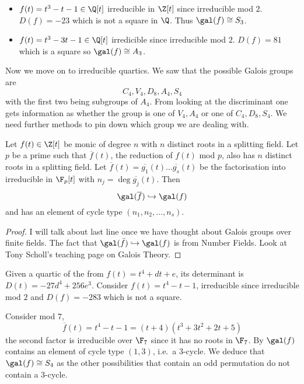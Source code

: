 \documentclass[a4paper]{article}
\newcommand*{\red}[1]{\overline{#1}}
\begin{document}
\begin{eg}\leavevmode
  \begin{itemize}
  \item \(f(t) = t^3 - t - 1 \in \Q[t]\) irreducible in \(\Z[t]\) since irreducible mod \(2\). \(D(f) = -23\) which is not a square in \(\Q\). Thus \(\gal(f) \cong S_3\).
  \item \(f(t) = t^3 - 3t - 1 \in \Q[t]\) irredicible since irreducible mod \(2\). \(D(f) = 81\) which is a square so \(\gal(f) \cong A_3\).
  \end{itemize}
\end{eg}

Now we move on to irreducible quartics. We saw that the possible Galois groups are
\[
  C_4, V_4, D_8, A_4, S_4
\]
with the first two being subgroups of \(A_4\). From looking at the discriminant one gets information as whether the group is one of \(V_4, A_4\) or one of \(C_4, D_8, S_4\). We need further methods to pin down which group we are dealing with.

\begin{theorem}
  \label{thm:mod p reduction}
  Let \(f(t) \in \Z[t]\) be monic of degree \(n\) with \(n\) distinct roots in a splitting field. Let \(p\) be a prime such that \(\red f(t)\), the reduction of \(f(t)\) mod \(p\), also has \(n\) distinct roots in a splitting field. Let \(\red f(t) = \red{g_1}(t) \dots \red{g_s}(t)\) be the factorisation into irreducible in \(\F_p[t]\) with \(n_j =  \deg \red{g_j}(t)\). Then
  \[
    \gal(\red f) \hookrightarrow \gal(f)
  \]
  and has an element of cycle type \((n_1, n_2, \dots, n_s)\).
\end{theorem}

\begin{proof}
  I will talk about last line once we have thought about Galois groups over finite fields. The fact that \(\gal(\bar f) \hookrightarrow \gal(f)\) is from Number Fields. Look at Tony Scholl's teaching page on Galois Theory.
\end{proof}

\begin{eg}
  Given a quartic of the from \(f(t) = t^4 + dt + e\), its determinant is \(D(t) = -27d^4 + 256e^3\). Consider \(f(t) = t^4 - t -1\), irreducible since irreducible mod \(2\) and \(D(f) = -283\) which is not a square.

  Consider mod \(7\),
  \[
    \red f(t) = t^4 - t - 1 = (t + 4)(t^3 + 3t^2 + 2t + 5)
  \]
  the second factor is irreducible over \(\F_7\) since it has no roots in \(\F_7\). By  \(\gal(f)\) contains an element of cycle type \((1, 3)\), i.e.\ a \(3\)-cycle. We deduce that \(\gal(f) \cong S_4\) as the other possibilities that contain an odd permutation do not contain a \(3\)-cycle.
\end{eg}
\end{document}
